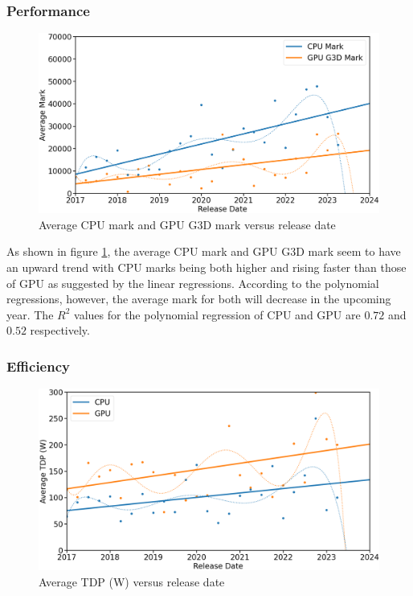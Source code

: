 \documentclass[conference]{IEEEtran}
\begin{document}
\subsubsection{Performance}
\begin{figure}[htbp]
	\centerline{\includegraphics[width=\columnwidth]{avg_mark_reg.png}}
	\caption{Average CPU mark and GPU G3D mark versus release date}
	\label{fig5}
\end{figure}

As shown in figure \ref{fig5}, the average CPU mark and GPU G3D mark seem to
have an upward trend with CPU marks being both higher and rising faster than
those of GPU as suggested by the linear regressions. According to the
polynomial regressions, however, the average mark for both will decrease in
the upcoming year. The $R^{2}$ values for the polynomial regression of CPU
and GPU are $0.72$ and $0.52$ respectively.

\subsubsection{Efficiency}
\begin{figure}[htbp]
	\centerline{\includegraphics[width=\columnwidth]{avg_tdp_reg.png}}
	\caption{Average TDP (W) versus release date}
	\label{fig6}
\end{figure}
\end{document}
